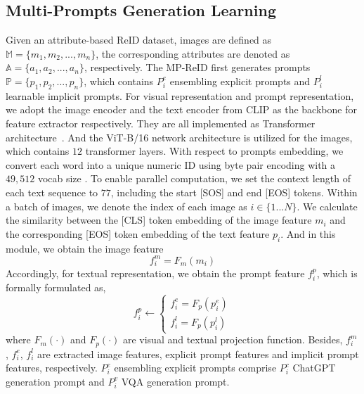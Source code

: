 \documentclass[letterpaper]{article} %
\begin{document}
\subsection{Multi-Prompts Generation Learning}\label{mpgl}
Given an attribute-based ReID dataset, images are defined as $\mathbb{M}=\{m_1, m_2, ..., m_n\}$, the corresponding attributes are denoted as $\mathbb{A}=\{a_1, a_2, ..., a_n\}$, respectively. The MP-ReID first generates prompts $\mathbb{P}=\{p_1, p_2, ..., p_n\}$, which contains $P_{i}^{e}$ ensembling explicit prompts and $P_{i}^{l}$ learnable implicit prompts. For visual representation and prompt representation, we adopt the image encoder and the text encoder from CLIP as the backbone for feature extractor respectively. They are all implemented as Transformer architecture~\cite{he2021dense,zhu2023learning}. And the ViT-B/16 network architecture \cite{dosovitskiy2020vit} is utilized for the images, which contains $12$ transformer layers. With respect to prompts embedding, we convert each word into a unique numeric ID using byte pair encoding with a $49,512$ vocab size \cite{sennrich2016neural}. To enable parallel computation, we set the context length of each text sequence to $77$, including the start [SOS] and end [EOS] tokens. Within a batch of images, we denote the index of each image as $i \in \{ {1...N} \}$. We calculate the similarity between the [CLS] token embedding of the image feature $m_{i}$ and the corresponding [EOS] token embedding of the text feature $p_{i}$. And in this module, we obtain the image feature 
\begin{equation}\label{eqn1}
f_{i}^{m} = F_m(m_i)
\end{equation}
Accordingly, for textual representation, we obtain the prompt feature $f_{i}^{p}$, which is formally formulated as,
\begin{equation}\label{eqn2}
{f}_{i}^{p}\leftarrow
\left\{
\begin{array}{l}
{f}_{i}^{e} = F_p(p_{i}^{e})\\
{f}_{i}^{l} = F_p(p_{i}^{l})
\end{array}
\right.
\end{equation}where $F_m (\cdot)$ and $F_p (\cdot)$ are visual and textual projection function. Besides, $f_{i}^{m}$, ${f}_{i}^{e}$, ${f}_{i}^{l}$ are extracted image features, explicit prompt features and implicit prompt features, respectively. $P_{i}^{e}$ ensembling explicit prompts comprise $P_{i}^{c}$ ChatGPT generation prompt and $P_{i}^{v}$ VQA generation prompt.
\end{document}

